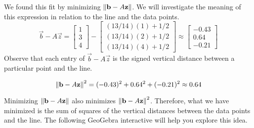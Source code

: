 \documentclass{ximera}
\begin{document}
\begin{exploration}
We found this fit by minimizing $\left\lVert\mathbf{b}-A\mathbf{z}\right\rVert$.  We will investigate the meaning of this expression in relation to the line and the data points.
\begin{equation}
    \vec{b}-A\vec{z}=\begin{bmatrix}1\\3\\4\end{bmatrix}-\begin{bmatrix}(13/14)(1)+1/2\\(13/14)(2)+1/2\\{(13/14)(4)+1/2}\end{bmatrix}\approx\begin{bmatrix}
        -0.43\\0.64\\-0.21
    \end{bmatrix}
\end{equation}
Observe that each entry of $\vec{b}-A\vec{z}$ is the signed vertical distance between a particular point and the line.

\begin{equation}
    \left\lVert\mathbf{b}-A\mathbf{z}\right\rVert^2=(-0.43)^2+0.64^2+(-0.21)^2\approx 0.64
\end{equation}

Minimizing $\left\lVert\mathbf{b}-A\mathbf{z}\right\rVert$ also minimizes $\left\lVert\mathbf{b}-A\mathbf{z}\right\rVert^2$.  Therefore, what we have minimized is the sum of squares of the vertical distances between the data points and the line.
The following GeoGebra interactive will help you explore this idea.

\begin{onlineOnly}
\begin{center}
\end{center}
\end{onlineOnly}
\end{exploration}
\end{document}
